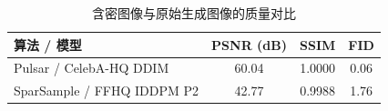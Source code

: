 \begin{table}[htbp]
    \caption{含密图像与原始生成图像的质量对比}
    \centering
    \begin{tabular}{lccc}
        \hline
        \textbf{算法 / 模型} & \textbf{PSNR (dB)} & \textbf{SSIM} & \textbf{FID} \\
        \hline
        Pulsar / CelebA-HQ DDIM & 60.04 & 1.0000 & 0.06 \\
        SparSample / FFHQ IDDPM P2 & 42.77 & 0.9988 & 1.76 \\
        \hline
    \end{tabular}
    \label{tab:image_quality}
\end{table}